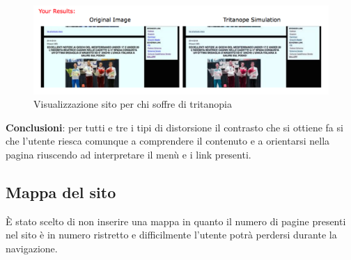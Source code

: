 	\begin{figure}[h!]
		\centering
		\includegraphics[scale=0.4]{images/contrasto_pagina_tritanope.png}
		\caption{Visualizzazione sito per chi soffre di tritanopia}
		\label{tritanopia}
	\end{figure}
	\newpage
	\textbf{Conclusioni}: per tutti e tre i tipi di distorsione il contrasto che si ottiene fa si che l'utente riesca comunque a comprendere il contenuto e a orientarsi nella pagina riuscendo ad interpretare il men\`u e i link presenti.

\subsection{Mappa del sito}
\`E stato scelto di non inserire una mappa in quanto il numero di pagine presenti nel sito \`e in numero ristretto e difficilmente l'utente potr\`a perdersi durante la navigazione.